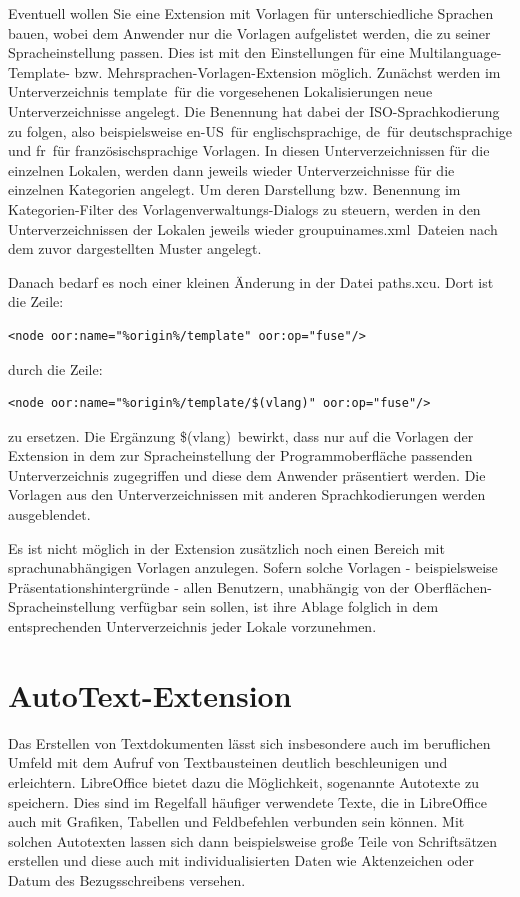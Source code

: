 \documentclass[a4paper,10pt,pagesize,titlepage]{scrbook}
\begin{document}
Eventuell wollen Sie eine Extension mit Vorlagen für unterschiedliche Sprachen bauen, wobei dem Anwender nur die Vorlagen aufgelistet werden, die zu seiner Spracheinstellung passen. Dies ist mit den Einstellungen für eine Multilanguage-Template- bzw. Mehrsprachen-Vorlagen-Extension möglich. Zunächst werden im Unterverzeichnis \glqq template\grqq~für die vorgesehenen Lokalisierungen neue Unterverzeichnisse angelegt. Die Benennung hat dabei der ISO-Sprachkodierung zu folgen, also  beispielsweise \glqq en-US\grqq~für englischsprachige, \glqq de\grqq~für deutschsprachige und \glqq fr\grqq~für französischsprachige Vorlagen. In diesen Unterverzeichnissen für die einzelnen Lokalen, werden dann jeweils wieder Unterverzeichnisse für die einzelnen Kategorien angelegt. Um deren Darstellung bzw. Benennung im Kategorien-Filter des Vorlagenverwaltungs-Dialogs zu steuern, werden in den Unterverzeichnissen der Lokalen jeweils wieder \glqq groupuinames.xml\grqq~Dateien nach dem zuvor dargestellten Muster angelegt.

Danach bedarf es noch einer kleinen Änderung in der Datei \glqq paths.xcu\grqq. Dort ist die Zeile:
\begin{lstlisting}
<node oor:name="%origin%/template" oor:op="fuse"/>
\end{lstlisting}

durch die Zeile:
\begin{lstlisting}
<node oor:name="%origin%/template/$(vlang)" oor:op="fuse"/>
\end{lstlisting}

zu ersetzen. Die Ergänzung \glqq \$(vlang)\grqq~bewirkt, dass nur auf die Vorlagen der Extension in dem zur Spracheinstellung der Programmoberfläche passenden Unterverzeichnis zugegriffen und diese dem Anwender präsentiert werden. Die Vorlagen aus den Unterverzeichnissen mit anderen Sprachkodierungen werden ausgeblendet.

Es ist nicht möglich in der Extension zusätzlich noch einen Bereich mit sprachunabhängigen Vorlagen anzulegen. Sofern solche Vorlagen - beispielsweise Präsentationshintergründe - allen Benutzern, unabhängig von der Oberflächen-Spracheinstellung verfügbar sein sollen, ist ihre Ablage folglich in dem entsprechenden Unterverzeichnis jeder Lokale vorzunehmen.

\section{AutoText-Extension}

Das Erstellen von Textdokumenten lässt sich insbesondere auch im beruflichen Umfeld mit dem Aufruf von Textbausteinen deutlich beschleunigen und erleichtern. LibreOffice bietet dazu die Möglichkeit, sogenannte Autotexte zu speichern. Dies sind im Regelfall häufiger verwendete Texte, die in LibreOffice auch mit Grafiken, Tabellen und Feldbefehlen verbunden sein können. Mit solchen Autotexten lassen sich dann beispielsweise große Teile von Schriftsätzen erstellen und diese auch mit individualisierten Daten wie Aktenzeichen oder Datum des Bezugsschreibens versehen.
\end{document}
